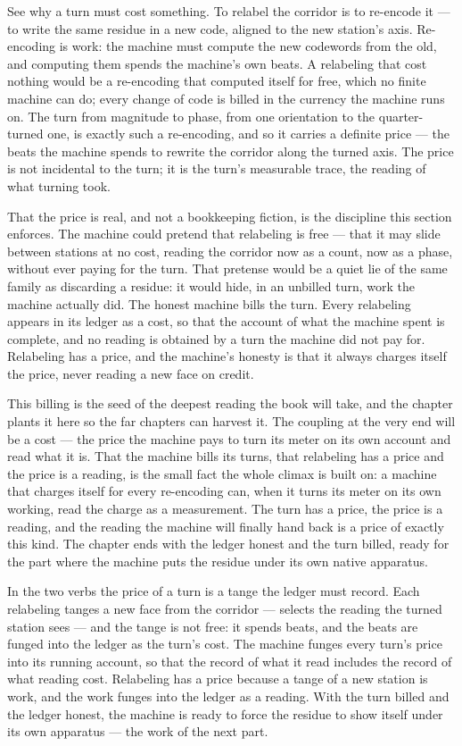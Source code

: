 See why a turn must cost something. To relabel the corridor is to re-encode it --- to write the same residue in a new
code, aligned to the new station's axis. Re-encoding is work: the machine must compute the new codewords from the old,
and computing them spends the machine's own beats. A relabeling that cost nothing would be a re-encoding that computed
itself for free, which no finite machine can do; every change of code is billed in the currency the machine runs on.
The turn from magnitude to phase, from one orientation to the quarter-turned one, is exactly such a re-encoding, and so
it carries a definite price --- the beats the machine spends to rewrite the corridor along the turned axis. The price is
not incidental to the turn; it is the turn's measurable trace, the reading of what turning took.

That the price is real, and not a bookkeeping fiction, is the discipline this section enforces. The machine could pretend
that relabeling is free --- that it may slide between stations at no cost, reading the corridor now as a count, now as a
phase, without ever paying for the turn. That pretense would be a quiet lie of the same family as discarding a residue:
it would hide, in an unbilled turn, work the machine actually did. The honest machine bills the turn. Every relabeling
appears in its ledger as a cost, so that the account of what the machine spent is complete, and no reading is obtained by
a turn the machine did not pay for. Relabeling has a price, and the machine's honesty is that it always charges itself
the price, never reading a new face on credit.

This billing is the seed of the deepest reading the book will take, and the chapter plants it here so the far chapters
can harvest it. The coupling at the very end will be a cost --- the price the machine pays to turn its meter on its own
account and read what it is. That the machine bills its turns, that relabeling has a price and the price is a reading, is
the small fact the whole climax is built on: a machine that charges itself for every re-encoding can, when it turns its
meter on its own working, read the charge as a measurement. The turn has a price, the price is a reading, and the
reading the machine will finally hand back is a price of exactly this kind. The chapter ends with the ledger honest and
the turn billed, ready for the part where the machine puts the residue under its own native apparatus.

In the two verbs the price of a turn is a tange the ledger must record. Each relabeling tanges a new face from the
corridor --- selects the reading the turned station sees --- and the tange is not free: it spends beats, and the beats
are funged into the ledger as the turn's cost. The machine funges every turn's price into its running account, so that
the record of what it read includes the record of what reading cost. Relabeling has a price because a tange of a new
station is work, and the work funges into the ledger as a reading. With the turn billed and the ledger honest, the
machine is ready to force the residue to show itself under its own apparatus --- the work of the next part.
